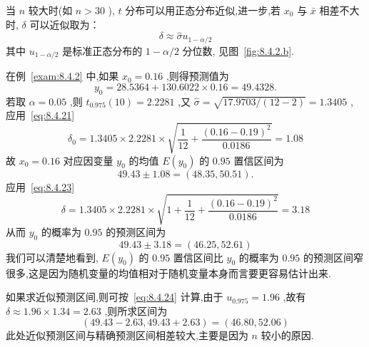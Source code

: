 当 $n$ 较大时(如 $n>30$ ), $t$ 分布可以用正态分布近似,进一步,若 $x_0$ 与 $\bar{x}$ 相差不大时, $\delta$ 可以近似取为：
\begin{equation}\label{eq:8.4.24}
\delta \approx \hat{\sigma} u_{1-\alpha/2}
\end{equation}
其中 $u_{1-\alpha/2}$ 是标准正态分布的 $1-\alpha/2$ 分位数, 见图~\ref{fig:8.4.2.b}.

\begin{example}
    在例~\ref{exam:8.4.2} 中,如果 $x_0=0.16$ ,则得预测值为
    \begin{equation*}\label{eq:8.4.25}
    y_0=28.5364+130.6022 \times 0.16=49.4328.
    \end{equation*}
    若取 $\alpha=0.05$ ,则 $t_{0.975}(10)=2.2281$ ,又 $\hat{\sigma}=\sqrt{17.9703/(12-2)}=1.3405$ , 应用~\eqref{eq:8.4.21}
    \begin{equation*}
    \delta_{0}=1.3405 \times 2.2281 \times \sqrt{\frac{1}{12}+\frac{(0.16-0.19)^{2}}{0.0186}}=1.08
    \end{equation*}
    故 $x_0=0.16$ 对应因变量 $y_0$ 的均值 $E(y_0)$ 的 $0.95$ 置信区间为
    \begin{equation*}
    49.43\pm 1.08=\left( 48.35,50.51 \right).
    \end{equation*}
    应用~\eqref{eq:8.4.23}
    \begin{equation*}
    \delta=1.3405 \times 2.2281 \times \sqrt{1+\frac{1}{12}+\frac{(0.16-0.19)^{2}}{0.0186}}=3.18
    \end{equation*}
    从而 $y_0$ 的概率为 $0.95$ 的预测区间为
    \begin{equation*}
    49.43\pm 3.18=(46.25,52.61)
    \end{equation*}
    我们可以清楚地看到, $E(y_0)$ 的 $0.95$ 置信区间比 $y_0$ 的概率为 $0.95$ 的预测区间窄很多,这是因为随机变量的均值相对于随机变量本身而言要更容易估计出来.
    
    如果求近似预测区间,则可按~\eqref{eq:8.4.24} 计算,由于 $u_{0.975}=1.96$ ,故有 $\delta\approx 1.96\times 1.34=2.63$ ,则所求区间为
    \begin{equation*}
    (49.43-2.63,49.43+2.63)=(46.80,52.06)
    \end{equation*}
    此处近似预测区间与精确预测区间相差较大,主要是因为 $n$ 较小的原因.
\end{example}

